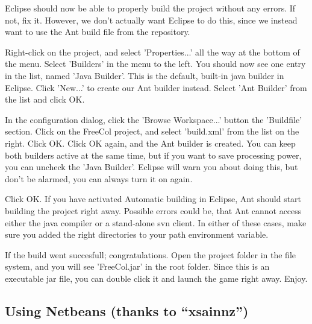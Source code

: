 \documentclass[12pt]{book}
\begin{document}
Eclipse should now be able to properly build the project without any
errors. If not, fix it. However, we don't actually want Eclipse to do
this, since we instead want to use the Ant build file from the
repository.

Right-click on the project, and select 'Properties...' all the way at
the bottom of the menu. Select 'Builders' in the menu to the left. You
should now see one entry in the list, named 'Java Builder'. This is
the default, built-in java builder in Eclipse. Click 'New...' to
create our Ant builder instead. Select 'Ant Builder' from the list and
click OK.

In the configuration dialog, click the 'Browse Workspace...' button
the 'Buildfile' section. Click on the FreeCol project, and select
'build.xml' from the list on the right. Click OK. Click OK again, and
the Ant builder is created. You can keep both builders active at the
same time, but if you want to save processing power, you can uncheck
the 'Java Builder'. Eclipse will warn you about doing this, but don't
be alarmed, you can always turn it on again.

Click OK. If you have activated Automatic building in Eclipse, Ant
should start building the project right away. Possible errors could
be, that Ant cannot access either the java compiler or a stand-alone
svn client. In either of these cases, make sure you added the right
directories to your path environment variable.

If the build went succesfull; congratulations. Open the project folder
in the file system, and you will see 'FreeCol.jar' in the root
folder. Since this is an executable jar file, you can double click it
and launch the game right away. Enjoy.


\hypertarget{Using Netbeans}{\subsection{Using Netbeans (thanks to ``xsainnz'')}}
\end{document}
